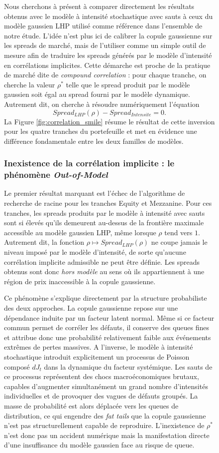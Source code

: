 \begin{figure}[H]
Nous cherchons à présent à comparer directement les résultats obtenus avec le modèle à intensité stochastique avec sauts à ceux du modèle gaussien LHP utilisé comme référence dans l'ensemble de notre étude. L'idée n'est plus ici de calibrer la copule gaussienne sur les spreads de marché, mais de l'utiliser comme un simple outil de mesure afin de traduire les spreads générés par le modèle d'intensité en corrélations implicites. Cette démarche est proche de la pratique de marché dite de \textit{compound correlation} : pour chaque tranche, on cherche la valeur $\rho^{\ast}$ telle que le spread produit par le modèle gaussien soit égal au spread fourni par le modèle dynamique. Autrement dit, on cherche à résoudre numériquement l'équation
$$
Spread_{LHP}(\rho)-Spread_{Intensite}=0.
$$
La Figure \ref{fig:correlation_smile} résume le résultat de cette inversion pour les quatre tranches du portefeuille et met en évidence une différence fondamentale entre les deux familles de modèles.

\subsubsection{Inexistence de la corrélation implicite : le phénomène \textit{Out-of-Model}}

Le premier résultat marquant est l'échec de l'algorithme de recherche de racine pour les tranches Equity et Mezzanine. Pour ces tranches, les spreads produits par le modèle à intensité avec sauts sont si élevés qu'ils demeurent au-dessus de la frontière maximale accessible au modèle gaussien LHP, même lorsque $\rho$ tend vers $1$. Autrement dit, la fonction $\rho \mapsto Spread_{LHP}(\rho)$ ne coupe jamais le niveau imposé par le modèle d'intensité, de sorte qu'aucune corrélation implicite admissible ne peut être définie. Les spreads obtenus sont donc \textit{hors modèle} au sens où ils appartiennent à une région de prix inaccessible à la copule gaussienne.

Ce phénomène s'explique directement par la structure probabiliste des deux approches. La copule gaussienne repose sur une dépendance induite par un facteur latent normal. Même si ce facteur commun permet de corréler les défauts, il conserve des queues fines et attribue donc une probabilité relativement faible aux événements extrêmes de pertes massives. A l'inverse, le modèle à intensité stochastique introduit explicitement un processus de Poisson composé $dJ_t$ dans la dynamique du facteur systémique. Les sauts de ce processus représentent des chocs macroéconomiques brutaux, capables d'augmenter simultanément un grand nombre d'intensités individuelles et de provoquer des vagues de défauts groupés. La masse de probabilité est alors déplacée vers les queues de distribution, ce qui engendre des \textit{fat tails} que la copule gaussienne n'est pas structurellement capable de reproduire. L'inexistence de $\rho^{\ast}$ n'est donc pas un accident numérique mais la manifestation directe d'une insuffisance du modèle gaussien face au risque de queue.


\end{figure}
